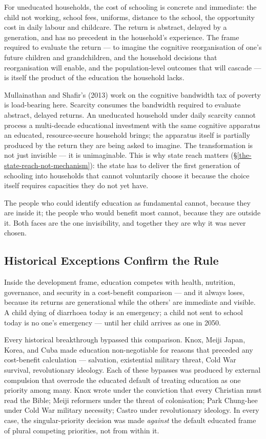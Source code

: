\documentclass[12pt,letterpaper]{article}
\begin{document}
For uneducated households, the cost of schooling is concrete and
immediate: the child not working, school fees, uniforms, distance to
the school, the opportunity cost in daily labour and childcare. The
return is abstract, delayed by a generation, and has no precedent in
the household's experience. The frame required to evaluate the
return --- to imagine the cognitive reorganisation of one's future
children and grandchildren, and the household decisions that reorganisation will
enable, and the population-level outcomes that will cascade --- is
itself the product of the education the household lacks.

Mullainathan and Shafir's (2013) work on the cognitive bandwidth tax
of poverty is load-bearing here. Scarcity consumes the bandwidth
required to evaluate abstract, delayed returns. An uneducated
household under daily scarcity cannot process a multi-decade
educational investment with the same cognitive apparatus an educated,
resource-secure household brings; the apparatus itself is partially
produced by the return they are being asked to imagine. The
transformation is not just invisible --- it is unimaginable. This is
why state reach matters
(\S\ref{the-state-reach-not-mechanism}):
the state has to deliver the first generation of schooling into
households that cannot voluntarily choose it because the choice
itself requires capacities they do not yet have.

The people who could identify education as fundamental cannot,
because they are inside it; the people who would benefit most cannot,
because they are outside it. Both faces are the one invisibility, and
together they are why it was never chosen.

\subsection{Historical Exceptions Confirm the Rule}\label{historical-exceptions-confirm-the-rule}

Inside the development frame, education competes with health,
nutrition, governance, and security in a cost-benefit comparison ---
and it always loses, because its returns are generational while the
others' are immediate and visible. A child dying of diarrhoea today is
an emergency; a child not sent to school today is no one's emergency
--- until her child arrives as one in 2050.

Every historical breakthrough bypassed this comparison. Knox, Meiji
Japan, Korea, and Cuba made education non-negotiable for reasons that
preceded any cost-benefit calculation --- salvation, existential
military threat, Cold War survival, revolutionary ideology. Each of
these bypasses was produced by external compulsion that overrode the
educated default of treating education as one priority among many.
Knox wrote under the conviction that every Christian must read the
Bible; Meiji reformers under the threat of colonisation; Park
Chung-hee under Cold War military necessity; Castro under
revolutionary ideology. In every case, the singular-priority decision
was made \emph{against} the default educated frame of plural
competing priorities, not from within it.
\end{document}
